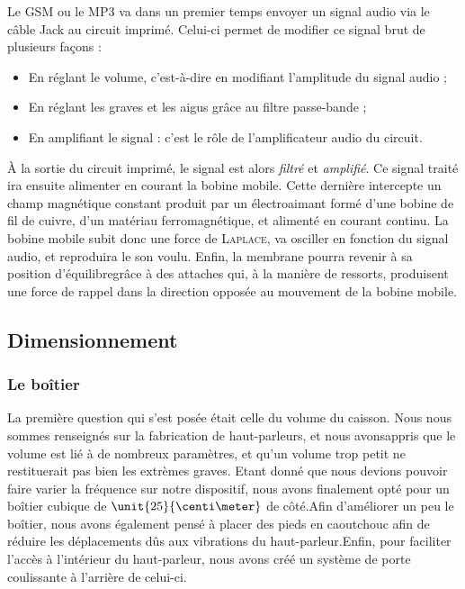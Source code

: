 \documentclass{article}
\begin{document}
\begin{itemize}
\begin{itemize}
Le GSM ou le MP3 va dans un premier temps envoyer un signal audio via le câble Jack au circuit imprimé. Celui-ci permet
de modifier ce signal brut de plusieurs façons :

\begin{itemize}
	\item En réglant le volume, c'est-à-dire en modifiant l'amplitude du signal audio ;
	\item En réglant les graves et les aigus grâce au filtre passe-bande ;
	\item En amplifiant le signal : c'est le rôle de l'amplificateur audio du circuit.
\end{itemize}

À la sortie du circuit imprimé, le signal est alors \textit{filtré} et \textit{amplifié}.
Ce signal traité ira ensuite alimenter en courant la bobine mobile. Cette dernière intercepte un champ magnétique constant 
produit par un électroaimant formé d'une bobine de fil de cuivre, d'un matériau ferromagnétique, et alimenté en courant continu.
La bobine mobile subit donc une force de \textsc{Laplace}, va osciller en fonction du  signal audio, et reproduira le son voulu.
Enfin, la membrane pourra revenir à sa position d'équilibregrâce à des attaches qui, à la manière de ressorts, produisent une
force de rappel dans la direction opposée au mouvement de la bobine mobile. 

\subsection{Dimensionnement}
\subsubsection{Le boîtier}
La première question qui s'est posée était celle du volume du caisson. Nous nous sommes renseignés sur la fabrication de 
haut-parleurs, et nous avonsappris que le volume est lié à de nombreux paramètres, et qu'un volume trop petit ne restituerait 
pas bien les extrèmes graves. Etant donné que nous devions pouvoir faire varier la fréquence sur notre dispositif, nous avons 
finalement opté pour un boîtier cubique de $\unit{25}{\centi\meter}$ de côté.Afin d'améliorer un peu le boîtier, nous avons
également pensé à placer des pieds en caoutchouc afin de réduire les déplacements dûs aux vibrations du haut-parleur.Enfin,
pour faciliter l'accès à l'intérieur du haut-parleur, nous avons créé un système de porte coulissante à l'arrière de celui-ci.


\end{itemize}
\end{itemize}
\end{document}
